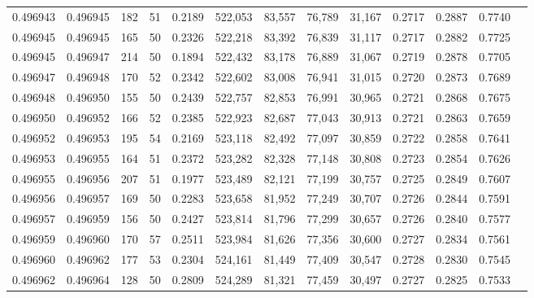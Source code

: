 \begin{tabular}{rrrrrrrrrrrrr}
0.496943 & 0.496945 &   182 &  51 &                                     0.2189 & 522,053 &  83,557 &  76,789 &  31,167 & 0.2717 & 0.2887 & 0.7740 \\
0.496945 & 0.496945 &   165 &  50 &                                     0.2326 & 522,218 &  83,392 &  76,839 &  31,117 & 0.2717 & 0.2882 & 0.7725 \\
0.496945 & 0.496947 &   214 &  50 &                                     0.1894 & 522,432 &  83,178 &  76,889 &  31,067 & 0.2719 & 0.2878 & 0.7705 \\
0.496947 & 0.496948 &   170 &  52 &                                     0.2342 & 522,602 &  83,008 &  76,941 &  31,015 & 0.2720 & 0.2873 & 0.7689 \\
0.496948 & 0.496950 &   155 &  50 &                                     0.2439 & 522,757 &  82,853 &  76,991 &  30,965 & 0.2721 & 0.2868 & 0.7675 \\
0.496950 & 0.496952 &   166 &  52 &                                     0.2385 & 522,923 &  82,687 &  77,043 &  30,913 & 0.2721 & 0.2863 & 0.7659 \\
0.496952 & 0.496953 &   195 &  54 &                                     0.2169 & 523,118 &  82,492 &  77,097 &  30,859 & 0.2722 & 0.2858 & 0.7641 \\
0.496953 & 0.496955 &   164 &  51 &                                     0.2372 & 523,282 &  82,328 &  77,148 &  30,808 & 0.2723 & 0.2854 & 0.7626 \\
0.496955 & 0.496956 &   207 &  51 &                                     0.1977 & 523,489 &  82,121 &  77,199 &  30,757 & 0.2725 & 0.2849 & 0.7607 \\
0.496956 & 0.496957 &   169 &  50 &                                     0.2283 & 523,658 &  81,952 &  77,249 &  30,707 & 0.2726 & 0.2844 & 0.7591 \\
0.496957 & 0.496959 &   156 &  50 &                                     0.2427 & 523,814 &  81,796 &  77,299 &  30,657 & 0.2726 & 0.2840 & 0.7577 \\
0.496959 & 0.496960 &   170 &  57 &                                     0.2511 & 523,984 &  81,626 &  77,356 &  30,600 & 0.2727 & 0.2834 & 0.7561 \\
0.496960 & 0.496962 &   177 &  53 &                                     0.2304 & 524,161 &  81,449 &  77,409 &  30,547 & 0.2728 & 0.2830 & 0.7545 \\
0.496962 & 0.496964 &   128 &  50 &                                     0.2809 & 524,289 &  81,321 &  77,459 &  30,497 & 0.2727 & 0.2825 & 0.7533 \\

\end{tabular}
